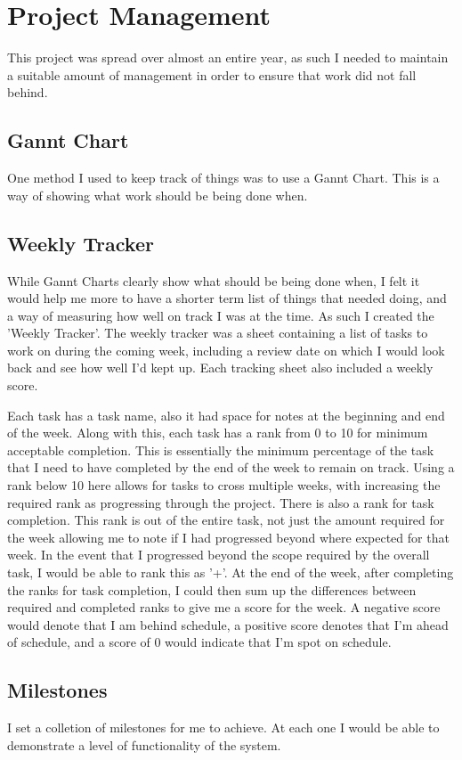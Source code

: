 \section{Project Management}
This project was spread over almost an entire year, as such I needed to maintain a suitable amount of management in order to ensure that work did not fall behind.

\subsection{Gannt Chart}
One method I used to keep track of things was to use a Gannt Chart. This is a way of showing what work should be being done when.

\subsection{Weekly Tracker}
While Gannt Charts clearly show what should be being done when, I felt it would help me more to have a shorter term list of things that needed doing, and a way of measuring how well on track I was at the time. As such I created the 'Weekly Tracker'.
The weekly tracker was a sheet containing a list of tasks to work on during the coming week, including a review date on which I would look back and see how well I'd kept up. Each tracking sheet also included a weekly score.

Each task has a task name, also it had space for notes at the beginning and end of the week. Along with this, each task has a rank from 0 to 10 for minimum acceptable completion. This is essentially the minimum percentage of the task that I need to have completed by the end of the week to remain on track. Using a rank below 10 here allows for tasks to cross multiple weeks, with increasing the required rank as progressing through the project.
There is also a rank for task completion. This rank is out of the entire task, not just the amount required for the week allowing me to note if I had progressed beyond where expected for that week. In the event that I progressed beyond the scope required by the overall task, I would be able to rank this as '+'.
At the end of the week, after completing the ranks for task completion, I could then sum up the differences between required and completed ranks to give me a score for the week.
A negative score would denote that I am behind schedule, a positive score denotes that I'm ahead of schedule, and a score of 0 would indicate that I'm spot on schedule.

\subsection{Milestones}
I set a colletion of milestones for me to achieve. At each one I would be able to demonstrate a level of functionality of the system.
